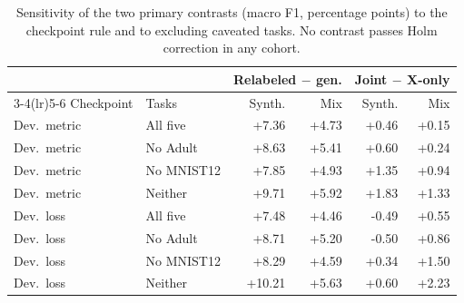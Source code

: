 \begin{table}[t]
\centering
\small
\setlength{\tabcolsep}{3pt}
\begin{tabular}{@{}llrrrr@{}}
\toprule
& & \multicolumn{2}{c}{Relabeled $-$ gen.} & \multicolumn{2}{c}{Joint $-$ X-only} \\
\cmidrule(lr){3-4}\cmidrule(lr){5-6}
Checkpoint & Tasks & Synth. & Mix & Synth. & Mix \\
\midrule
Dev.\ metric & All five & +7.36 & +4.73 & +0.46 & +0.15 \\
Dev.\ metric & No Adult & +8.63 & +5.41 & +0.60 & +0.24 \\
Dev.\ metric & No MNIST12 & +7.85 & +4.93 & +1.35 & +0.94 \\
Dev.\ metric & Neither & +9.71 & +5.92 & +1.83 & +1.33 \\
\addlinespace
Dev.\ loss & All five & +7.48 & +4.46 & -0.49 & +0.55 \\
Dev.\ loss & No Adult & +8.71 & +5.20 & -0.50 & +0.86 \\
Dev.\ loss & No MNIST12 & +8.29 & +4.59 & +0.34 & +1.50 \\
Dev.\ loss & Neither & +10.21 & +5.63 & +0.60 & +2.23 \\
\bottomrule
\end{tabular}
\caption{Sensitivity of the two primary contrasts (macro F1, percentage points) to the checkpoint rule and to excluding caveated tasks. No contrast passes Holm correction in any cohort.}
\label{tab:sensitivity}
\end{table}
